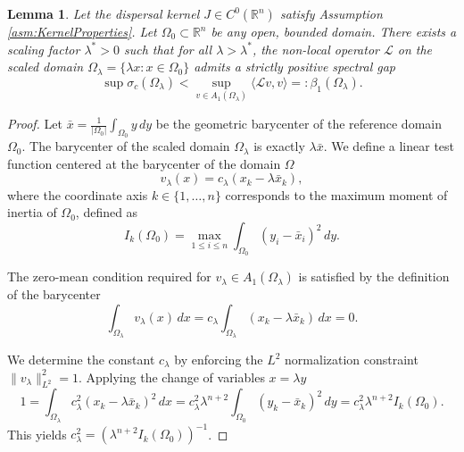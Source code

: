 \documentclass[12pt, a4paper]{article}
\theoremstyle{break}
\theoremstyle{break}
\theoremstyle{break}
\theoremstyle{break}
\theoremstyle{break}
\newtheorem{lem}{Lemma}[section]
\theoremstyle{break}
\theoremstyle{break}
\theoremstyle{break}
\theoremstyle{break}
\begin{document}
\begin{lem}
    \label{lem:large_domain_gap}
    Let the dispersal kernel $J \in C^0(\mathbb{R}^n)$ satisfy Assumption \ref{asm:KernelProperties}. Let $\Omega_0 \subset \mathbb{R}^n$ be any open, bounded domain. There exists a scaling factor $\lambda^* > 0$ such that for all $\lambda > \lambda^*$, the non-local operator $\mathcal{L}$ on the scaled domain $\Omega_\lambda = \{ \lambda x : x \in \Omega_0 \}$ admits a strictly positive spectral gap
    \begin{equation}
        \sup \sigma_c(\Omega_\lambda) < \sup_{v \in A_1(\Omega_\lambda)} \langle \mathcal{L}v, v \rangle =: \beta_1(\Omega_\lambda).
    \end{equation}
\end{lem}

\begin{proof}
    
    Let $\bar{x} = \frac{1}{|\Omega_0|} \int_{\Omega_0} y \, dy$ be the geometric barycenter of the reference domain $\Omega_0$. The barycenter of the scaled domain $\Omega_\lambda$ is exactly $\lambda \bar{x}$. We define a linear test function centered at the barycenter of the domain $\Omega$
    \begin{equation}
        v_\lambda(x) = c_\lambda (x_k - \lambda \bar{x}_k),
    \end{equation}
    where the coordinate axis $k \in \{1, \dots, n\}$ corresponds to the maximum moment of inertia of $\Omega_0$, defined as
    \begin{equation}
        I_k(\Omega_0) = \max_{1 \leq i \leq n} \int_{\Omega_0} (y_i - \bar{x}_i)^2 \, dy.
    \end{equation}
    
    The zero-mean condition required for $v_\lambda \in A_1(\Omega_\lambda)$ is satisfied by the definition of the barycenter
    \begin{equation}
        \int_{\Omega_\lambda} v_\lambda(x) \, dx = c_\lambda \int_{\Omega_\lambda} (x_k - \lambda \bar{x}_k) \, dx = 0.
    \end{equation}
    
    We determine the constant $c_\lambda$ by enforcing the $L^2$ normalization constraint $\|v_\lambda\|_{L^2}^2 = 1$. Applying the change of variables $x = \lambda y$
    \begin{equation}
        1 = \int_{\Omega_\lambda} c_\lambda^2 (x_k - \lambda \bar{x}_k)^2 \, dx = c_\lambda^2 \lambda^{n+2} \int_{\Omega_0} (y_k - \bar{x}_k)^2 \, dy = c_\lambda^2 \lambda^{n+2} I_k(\Omega_0).
    \end{equation}
    This yields $c_\lambda^2 = (\lambda^{n+2} I_k(\Omega_0))^{-1}$.
    

\end{proof}
\end{document}
